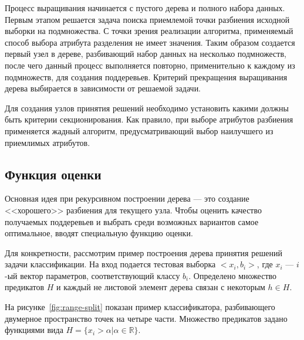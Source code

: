 \documentclass[a4paper,14pt]{extarticle} %
\begin{document}
Процесс выращивания начинается с пустого дерева и полного набора данных. Первым этапом решается задача поиска приемлемой точки разбиения исходной выборки на подмножества. С точки зрения реализации алгоритма, применяемый способ выбора атрибута разделения не имеет значения. Таким образом создается первый узел в дереве, разбивающий набор данных на несколько подмножеств, после чего данный процесс выполняется повторно, применительно к каждому из подмножеств, для создания поддеревьев. Критерий прекращения выращивания дерева выбирается в зависимости от решаемой задачи.

Для создания узлов принятия решений необходимо установить какими должны быть критерии секционирования. Как правило, при выборе атрибутов разбиения применяется жадный алгоритм, предусматривающий выбор наилучшего из приемлимых атрибутов.

\subsection{Функция оценки}
\hspace{\parindent} Основная идея при рекурсивном построении дерева --- это создание <<хорошего>> разбиения для текущего узла. Чтобы оценить качество получаемых поддеревьев и выбрать среди возможных вариантов самое оптимальное, вводят специальную функцию оценки. 

Для конкретности, рассмотрим пример построения дерева принятия решений задачи классификации. На вход подается тестовая выборка $<x_i,b_i>$, где $x_i$ --- $i$-ый вектор параметров, соответствующий классу $b_i$. Определено множество предикатов $H$ и каждый не листовой элемент дерева связан с некоторым $h \in H$. 

На рисунке~\ref{fig:range-split} показан пример классификатора, разбивающего двумерное пространство точек на четыре части. Множество предикатов задано функциями вида $H=\{x_i > \alpha | \alpha \in \mathbb{R}\}$.
\end{document}
